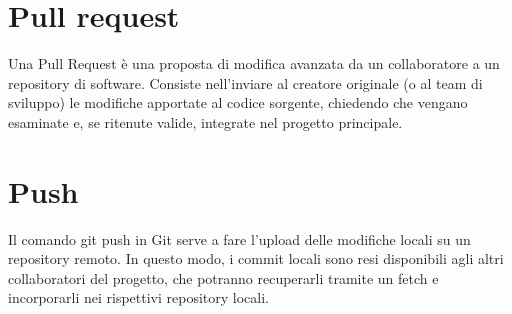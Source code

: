 \section{Pull request}
Una Pull Request è una proposta di modifica avanzata da un collaboratore a un repository di software. Consiste nell'inviare al creatore originale (o al team di sviluppo) le modifiche apportate al codice sorgente, chiedendo che vengano esaminate e, se ritenute valide, integrate nel progetto principale.

\section{Push}
Il comando git push in Git serve a fare l’upload delle modifiche locali su un repository remoto. In questo modo, i commit locali sono resi disponibili agli altri collaboratori del progetto, che potranno recuperarli tramite un fetch e incorporarli nei rispettivi repository locali.
